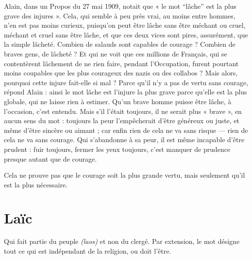 {Alain, dans un Propos du 27 mai 1909, notait que « le mot “lâche” est la plus
grave des injures ». Cela, qui semble à peu près vrai, au moins entre hommes, n’en
est pas moins curieux, puisqu'on peut être lâche sans être méchant ou cruel,
méchant et cruel sans être lâche, et que ces deux vices sont pires, assurément, que la
simple lâcheté. Combien de salauds sont capables de courage ? Combien de braves
gens, de lâcheté ? Et qui ne voit que ces millions de Français, qui se contentèrent
lâchement de ne rien faire, pendant l'Occupation, furent pourtant moins coupables
que les plus courageux des nazis ou des collabos ? Mais alors, pourquoi cette injure
fait-elle si mal ? Parce qu'il n’y a pas de vertu sans courage, répond Alain : ainsi le
mot lâche est l'injure la plus grave parce qu’elle est la plus globale, qui ne laisse rien
à estimer. Qu'un brave homme puisse être lâche, à l’occasion, c’est entendu. Mais
s’il l'était toujours, il ne serait plus « brave », en aucun sens du mot : toujours la
peur l'empêcherait d’être généreux ou juste, et même d’être sincère ou aimant ; car
enfin rien de cela ne va sans risque — rien de cela ne va sans courage. Qui s’abandonne
à sa peur, il est même incapable d’être prudent : fuir toujours, fermer les
yeux toujours, c'est manquer de prudence presque autant que de courage.

Cela ne prouve pas que le courage soit la plus grande vertu, mais seulement
qu’il est la plus nécessaire.

\section{Laïc}
Qui fait partie du peuple {\it (laos)} et non du clergé. Par extension, le mot
désigne tout ce qui est indépendant de la religion, ou doit l'être.

}
